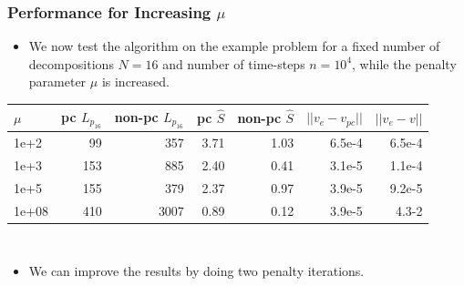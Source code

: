 \documentclass[9pt]{beamer}
\begin{document}
\begin{frame}
\frametitle{Performance for Increasing $\mu$}
\begin{itemize}
\item{We now test the algorithm on the example problem for a fixed number of decompositions $N=16$ and number of time-steps $n=10^4$, while the penalty parameter $\mu$ is increased.}
\end{itemize}
{\small\begin{table}
\centering
\begin{tabular}{lrrrrrr}
\toprule
{} $\mu$&    pc $L_{p_{16}}$ & non-pc $L_{p_{16}}$  &  pc $\hat S$ & non-pc $\hat S$ &  $||v_e-v_{pc}||$ &      $||v_e-v||$\\
\midrule
1e+2   &   99 &  357 &  3.71 &  1.03 &  6.5e-4 &   6.5e-4\\
1e+3  &  153 &  885 &  2.40 &  0.41 &  3.1e-5 &  1.1e-4 \\
1e+5 &  155 &  379 &  2.37 &  0.97 &  3.9e-5 &  9.2e-5 \\
1e+08 &  410 &  3007 &  0.89 &  0.12 &  3.9e-5 &  4.3-2 \\
\bottomrule
\end{tabular}
\end{table}}
\begin{columns}
\begin{itemize}
\item<2->{We can improve the results by doing two penalty iterations.}
\end{itemize}
\end{columns}
\end{frame}
\end{document}
